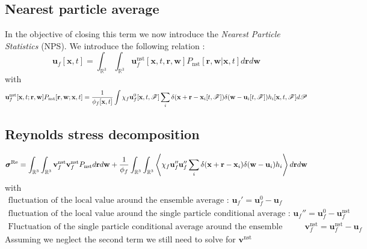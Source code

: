 \subsection{Nearest particle average}
In the objective of closing this term we now introduce the \textit{Nearest Particle Statistics} (NPS). 
We introduce the following relation \citet{zhang2021ensemble} :
\begin{equation*}
    \textbf{u}_f [\textbf{x},t]
    = 
    \int_{\mathbb{R}^3}
    \int_{\mathbb{R}^3}
    \textbf{u}_f^\text{nst}[\textbf{x},t, \textbf{r},\textbf{w}]
    P_\text{nst}[\textbf{r},\textbf{w}|\textbf{x},t]
    d\textbf{r}
    d\textbf{w}
\end{equation*}
with 
\begin{equation*}
    \textbf{u}_f^\text{nst}[\textbf{x},t; \textbf{r},\textbf{w}]
    P_\text{nst}[\textbf{r},\textbf{w};\textbf{x},t]
    =
    \frac{1}{\phi_f[\textbf{x},t]} 
    \int 
    \chi_f \textbf{u}_f^0[\textbf{x},t,\mathscr{F}]
    \sum_i 
    \delta(\textbf{x}+\textbf{r}-\textbf{x}_i[t,\mathscr{F}])
    \delta(\textbf{w}-\textbf{u}_i[t,\mathscr{F}])
    h_i[\textbf{x},t,\mathscr{F}]
    d\mathscr{P}
\end{equation*}

\subsection{Reynolds stress decomposition}
\begin{equation}
    \bm\sigma^\text{Re}
    = 
    \int_{\mathbb{R}^3}
    \int_{\mathbb{R}^3}
    \textbf{v}_f^\text{nst}
    \textbf{v}_f^\text{nst}
    P_\text{nst}
    d\textbf{r}
    d\textbf{w}
    + 
    \frac{1}{\phi_f}
    \int_{\mathbb{R}^3}
    \int_{\mathbb{R}^3}
    \left<
        \chi_f
        \textbf{u}_f''
        \textbf{u}_f''
        \sum_i 
        \delta(\textbf{x}+\textbf{r}-\textbf{x}_i)
        \delta(\textbf{w}-\textbf{u}_i)
        h_i
    \right>
    d\textbf{r}
    d\textbf{w}
\end{equation}
with 
\begin{align*}
    \text{fluctuation of the local value around the ensemble average : }\textbf{u}_f' = \textbf{u}_f^0 - \textbf{u}_f\\
    \text{fluctuation of the local value around the single particle conditional average : }\textbf{u}_f'' = \textbf{u}_f^0 - \textbf{u}_f^\text{nst}\\
    \text{Fluctuation of the single particle conditional average around the ensemble average : }\textbf{v}_f^\text{nst} = \textbf{u}_f^\text{nst} - \textbf{u}_f
\end{align*}
Assuming we neglect the second term we still need to solve for $\textbf{v}^\text{nst}$



